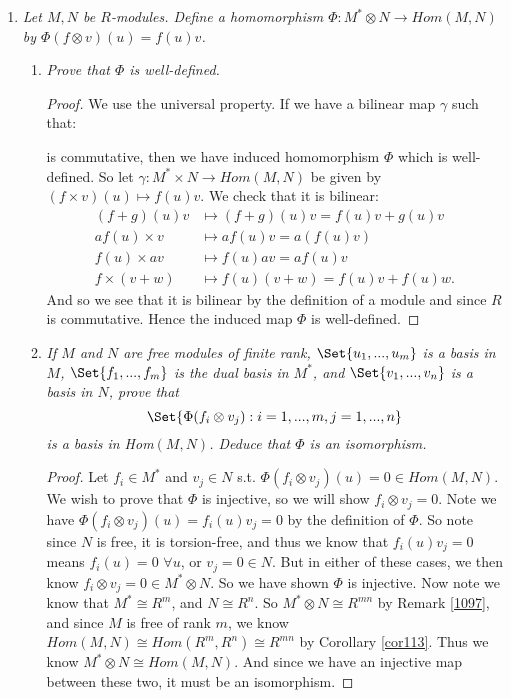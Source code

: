 \documentclass[9pt,reqno,twoside]{amsbook}
\theoremstyle{plain}
\numberwithin{section}{chapter}
\numberwithin{equation}{chapter}
\theoremstyle{definition}
\theoremstyle{remark}
\theoremstyle{plain}
\newcommand{\bb}{\vspace{3mm}}
\newcommand{\bee}{\begin{equation}\begin{aligned}}
\newcommand{\eee}{\end{aligned}\end{equation}}
\newcommand{\tens}{\otimes}
\begin{document}
\begin{enumerate}[label=\arabic*.]

\item \textit{Let $M,N$ be $R$-modules. Define a homomorphism $\Phi:M^* \tens N \to Hom(M,N)$ by $\Phi(f \tens v)(u) = f(u)v$. }

\begin{enumerate}


\item \textit{Prove that $\Phi$ is well-defined. }

\begin{proof}
We use the universal property. If we have a bilinear map $\gamma$ such that:
\begin{center}
\end{center}
is commutative, then we have induced homomorphism $\Phi$ which is well-defined. So let $\gamma:M^*\times N \to Hom(M,N)$ be given by $(f \times v)(u) \mapsto f(u)v$. We check that it is bilinear:
\bee
(f + g)(u)v &\mapsto (f + g)(u)v = f(u)v + g(u)v\\
af(u) \times v &\mapsto af(u)v = a(f(u)v)\\
f(u) \times av &\mapsto f(u)av = af(u)v\\
f \times (v + w) &\mapsto f(u)(v + w) = f(u)v + f(u)w.
\eee
And so we see that it is bilinear by the definition of a module and since $R$ is commutative. Hence the induced map $\Phi$ is well-defined. 
\end{proof}
\bb
\item \textit{If $M$ and $N$ are free modules of finite rank, $\Set{u_1,...,u_m}$ is a basis in $M$, $\Set{f_1,...,f_m}$ is the dual basis in $M^*$, and $\Set{v_1,...,v_n}$ is a basis in $N$, prove that
$$
\Set{\Phi(f_i \tens v_j): i = 1,...,m, j = 1,...,n}
$$
is a basis in Hom$(M,N)$. Deduce that $\Phi$ is an isomorphism. 
}

\begin{proof}
Let $f_i \in M^*$ and $v_j \in N$ s.t. $\Phi(f_i \tens v_j)(u) = 0 \in Hom(M,N)$. We wish to prove that $\Phi$ is injective, so we will show $f_i \tens v_j = 0$. Note we have $\Phi(f_i \tens v_j)(u) = f_i(u)v_j = 0$ by the definition of $\Phi$. So note since $N$ is free, it is torsion-free, and thus we know that $f_i(u)v_j = 0$ means $f_i(u) = 0$ $\forall u$, or $v_j = 0 \in N$. But in either of these cases, we then know $f_i \tens v_j = 0 \in M^* \tens N$. So we have shown $\Phi$ is injective. Now note we know that $M^* \cong R^m$, and $N \cong R^n$. So $M^* \tens N \cong R^{mn}$ by Remark \ref{1097}, and since $M$ is free of rank $m$, we know $Hom(M,N) \cong Hom(R^m,R^n) \cong R^{mn}$ by Corollary \ref{cor113}. Thus we know $M^* \tens N \cong Hom(M,N)$. And since we have an injective map between these two, it must be an isomorphism. 
\end{proof}


\end{enumerate}
\end{enumerate}
\end{document}
